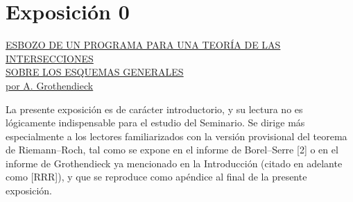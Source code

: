 
\section*{Exposición 0}
\begin{center}
\underline{ESBOZO DE UN PROGRAMA PARA UNA TEORÍA DE LAS INTERSECCIONES}\\[3pt]
\underline{SOBRE LOS ESQUEMAS GENERALES}\\[8pt]
\underline{por A. Grothendieck}
\end{center}

La presente exposición es de carácter introductorio, y su lectura no es
lógicamente indispensable para el estudio del Seminario. Se dirige más
especialmente a los lectores familiarizados con la versión provisional del
teorema de Riemann--Roch, tal como se expone en el informe de Borel--Serre
[2] o en el informe de Grothendieck ya mencionado en la Introducción (citado
en adelante como [RRR]), y que se reproduce como apéndice al final de la
presente exposición.

